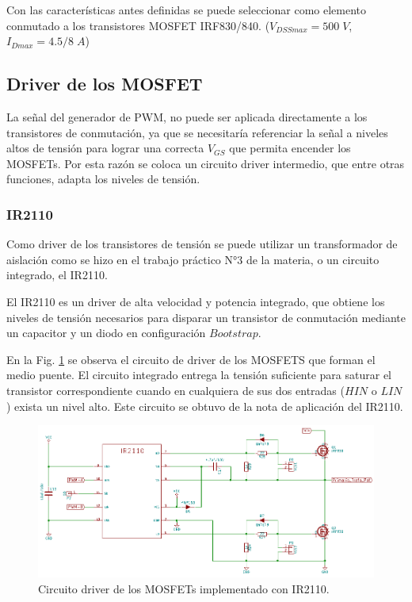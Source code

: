 \documentclass[11pt, a4paper]{article}
\begin{document}
Con las características antes definidas se puede seleccionar como elemento conmutado a los transistores MOSFET IRF830/840. ($V_{DSSmax} = 500 \; V$, $I_{Dmax} = 4.5/8 \; A$)

\subsection{Driver de los MOSFET}
La señal del generador de PWM, no puede ser aplicada directamente a los transistores de conmutación, ya que se necesitaría referenciar la señal a niveles altos de tensión para lograr una correcta $V_{GS}$ que permita
encender los MOSFETs. Por esta razón se coloca un circuito driver intermedio, que entre otras funciones, adapta los niveles de tensión.

\subsubsection{IR2110}
Como driver de los transistores de tensión se puede utilizar un transformador de aislación como se hizo en el trabajo práctico N°3 de la materia, o un circuito integrado, el IR2110.

El IR2110 es un driver de alta velocidad y potencia integrado, que obtiene los niveles de tensión necesarios para disparar un transistor de conmutación mediante un capacitor y un diodo en configuración $Bootstrap$. 

En la Fig. \ref{driver} se observa el circuito de driver de los MOSFETS que forman el medio puente. El circuito integrado entrega la tensión suficiente para saturar el transistor correspondiente cuando en cualquiera de sus dos entradas ($HIN$ o $LIN$) exista un nivel alto. Este circuito se obtuvo de la nota de aplicación del IR2110.

\begin{figure}[h]
	\centering
	\includegraphics[width = 12 cm]{Imagenes/driver}
	\caption{Circuito driver de los MOSFETs implementado con IR2110.}
	\label{driver}
\end{figure}
\end{document}
